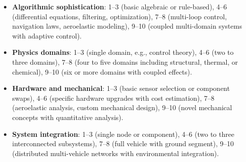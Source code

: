 \documentclass[11pt,letterpaper]{article}
\begin{document}
\begin{itemize}
    \item \textbf{Algorithmic sophistication}: 1--3 (basic algebraic or rule-based), 4--6 (differential equations, filtering, optimization), 7--8 (multi-loop control, navigation laws, aeroelastic modeling), 9--10 (coupled multi-domain systems with adaptive control).
    \item \textbf{Physics domains}: 1--3 (single domain, e.g., control theory), 4--6 (two to three domains), 7--8 (four to five domains including structural, thermal, or chemical), 9--10 (six or more domains with coupled effects).
    \item \textbf{Hardware and mechanical}: 1--3 (basic sensor selection or component swaps), 4--6 (specific hardware upgrades with cost estimation), 7--8 (aeroelastic analysis, custom mechanical design), 9--10 (novel mechanical concepts with quantitative analysis).
    \item \textbf{System integration}: 1--3 (single node or component), 4--6 (two to three interconnected subsystems), 7--8 (full vehicle with ground segment), 9--10 (distributed multi-vehicle networks with environmental integration).
\end{itemize}
\end{document}
